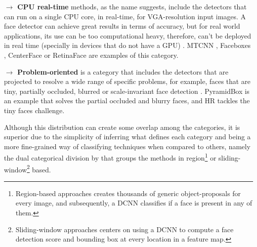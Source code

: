 \documentclass[class=report, crop=false, a4paper, 12pt]{standalone}
\begin{document}
\vspace{0.7\baselineskip}
\noindent\textbf{$\rightarrow$ CPU real-time} methods, as the name suggests, include the detectors that can run on a single CPU core, in real-time, for VGA-resolution input images. A face detector can achieve great results in terms of accuracy, but for real world applications, its use can be too computational heavy, therefore, can't be deployed in real time (specially in devices that do not have a GPU) \autocite{duElementsEndtoendDeep2022}. MTCNN \autocite{zhangJointFaceDetection2016a}, Faceboxes \autocite{zhangFaceBoxesCPURealtime2018}, CenterFace \autocite{xuCenterFaceJointFace2019} or RetinaFace \autocite{dengRetinaFaceSinglestageDense2019} are examples of this category.

\vspace{0.7\baselineskip}
\noindent\textbf{$\rightarrow$ Problem-oriented} is a category that includes the detectors that are projected to resolve a wide range of specific problems, for example, faces that are tiny, partially occluded, blurred or scale-invariant face detection \autocite{duElementsEndtoendDeep2022}. PyramidBox \autocite{tangPyramidBoxContextassistedSingle2018} is an example that solves the partial occluded and blurry faces, and HR \autocite{huFindingTinyFaces2017} tackles the tiny faces challenge.

\vspace{0.7\baselineskip}
Although this distribution can create some overlap among the categories, it is superior due to the simplicity of inferring what defines each category and being a more fine-grained way of classifying techniques when compared to others, namely the dual categorical division by \autocite{ranjanDeepLearningUnderstanding2018} that groups the methods in region\footnote{Region-based approaches creates thousands of generic object-proposals for every image, and subsequently, a DCNN classifies if a face is present in any of them.} or sliding-window\footnote{Sliding-window approaches centers on using a DCNN to compute a face detection score and bounding box at every location in a feature map.} based. 
\end{document}
